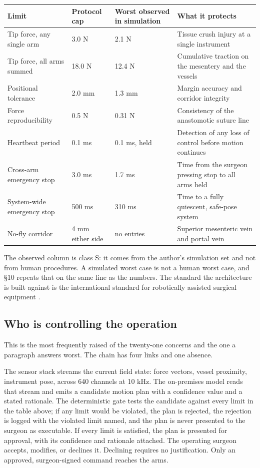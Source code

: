 \vspace{0.30em}

\noindent\begin{tabularx}{\textwidth}{L{4.4cm} C{2.3cm} C{2.4cm} Y}
\toprule
\textbf{Limit} & \textbf{Protocol cap} & \textbf{Worst observed in simulation} & \textbf{What it protects} \\
\midrule
Tip force, any single arm & 3.0 N & 2.1 N & Tissue crush injury at a single instrument \\
Tip force, all arms summed & 18.0 N & 12.4 N & Cumulative traction on the mesentery and the vessels \\
Positional tolerance & 2.0 mm & 1.3 mm & Margin accuracy and corridor integrity \\
Force reproducibility & 0.5 N & 0.31 N & Consistency of the anastomotic suture line \\
Heartbeat period & 0.1 ms & 0.1 ms, held & Detection of any loss of control before motion continues \\
Cross-arm emergency stop & 3.0 ms & 1.7 ms & Time from the surgeon pressing stop to all arms held \\
System-wide emergency stop & 500 ms & 310 ms & Time to a fully quiescent, safe-pose system \\
No-fly corridor & 4 mm either side & no entries & Superior mesenteric vein and portal vein \\
\bottomrule
\end{tabularx}

\vspace{0.30em}

\noindent The observed column is class S: it comes from the author's simulation
set \cite{pdac060s2030} and not from human procedures. A simulated worst case is
not a human worst case, and \S 10 repeats that on the same line as the numbers.
The standard the architecture is built against is the international standard for
robotically assisted surgical equipment \cite{iec8060127}.

\subsection{Who is controlling the operation}

This is the most frequently raised of the twenty-one concerns and the one a
paragraph answers worst. The chain has four links and one absence.

The sensor stack streams the current field state: force vectors, vessel
proximity, instrument pose, across 640 channels at 10 kHz. The on-premises model
reads that stream and emits a candidate motion plan with a confidence value and
a stated rationale. The deterministic gate tests the candidate against every
limit in the table above; if any limit would be violated, the plan is rejected,
the rejection is logged with the violated limit named, and the plan is never
presented to the surgeon as executable. If every limit is satisfied, the plan is
presented for approval, with its confidence and rationale attached. The
operating surgeon accepts, modifies, or declines it. Declining requires no
justification. Only an approved, surgeon-signed command reaches the arms.

